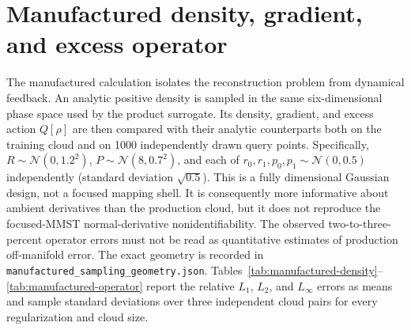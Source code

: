 \documentclass[
  11pt,
  letterpaper,
  onehalfspacing,
  normalmargins,
  equalmargins,
  oneside
]{ut-thesis}
\begin{document}
\section{Manufactured density, gradient, and excess operator}
\label{sec:results-manufactured}

The manufactured calculation isolates the reconstruction problem from
dynamical feedback. An analytic positive density is sampled in the same
six-dimensional phase space used by the product surrogate. Its density,
gradient, and excess action \(Q[\rho]\) are then compared with their analytic
counterparts both on the training cloud and on 1000 independently drawn query
points. Specifically,
\(R\sim\mathcal N(0,1.2^2)\), \(P\sim\mathcal N(8,0.7^2)\), and each of
\(r_0,r_1,p_0,p_1\sim\mathcal N(0,0.5)\) independently (standard deviation
\(\sqrt{0.5}\)). This is a fully dimensional Gaussian design, not a focused mapping shell.
It is consequently more informative about ambient derivatives
than the production cloud, but it does not reproduce the focused-MMST
normal-derivative nonidentifiability. The observed two-to-three-percent
operator errors must not be read as quantitative estimates of production
off-manifold error. The exact geometry is recorded in
\texttt{manufactured\_sampling\_geometry.json}.
Tables~\ref{tab:manufactured-density}--\ref{tab:manufactured-operator}
report the relative \(L_1\), \(L_2\), and \(L_\infty\) errors as means and
sample standard deviations over three independent cloud pairs for every
regularization and cloud size.
\end{document}
